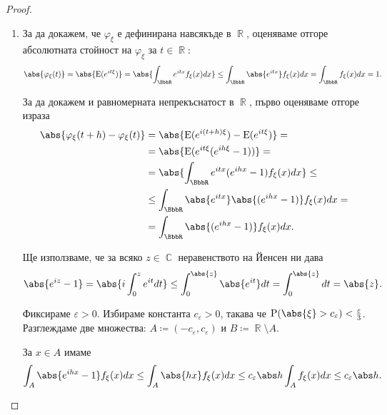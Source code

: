 \documentclass{../../common/topic}
\begin{document}
\begin{proof}
  \hfill
  \begin{enumerate}
    \item За да докажем, че \( \varphi_\xi \) е дефинирана навсякъде в \( \BbbR \), оценяваме отгоре абсолютната стойност на \( \varphi_\xi \) за \( t \in \BbbR \):
    \begin{equation*}
      \abs{\varphi_\xi(t)}
      =
      \abs{\Expect(e^{it\xi})}
      =
      \abs{\int_{\BbbR} e^{itx} f_\xi(x) dx}
      \leq
      \int_{\BbbR} \abs{e^{itx}} f_\xi(x) dx
      =
      \int_{\BbbR} f_\xi(x) dx
      =
      1.
    \end{equation*}

    За да докажем и равномерната непрекъснатост в \( \BbbR \), първо оценяваме отгоре израза
    \begin{align*}
      \abs{\varphi_\xi(t + h) - \varphi_\xi(t)}
      &=
      \abs{\Expect(e^{i(t + h)\xi}) - \Expect(e^{it\xi})}
      = \\ &=
      \abs{\Expect(e^{it\xi} (e^{ih\xi} - 1))}
      = \\ &=
      \abs{\int_{\BbbR} e^{itx} (e^{ihx} - 1) f_\xi(x) dx}
      \leq \\ &\leq
      \int_{\BbbR} \abs{e^{itx}} \abs{(e^{ihx} - 1)} f_\xi(x) dx
      = \\ &=
      \int_{\BbbR} \abs{(e^{ihx} - 1)} f_\xi(x) dx.
    \end{align*}

    Ще използваме, че за всяко \( z \in \BbbC \) неравенството на Йенсен ни дава
    \begin{equation*}
      \abs{e^{iz} - 1}
      =
      \abs{i \int_0^z e^{it} dt}
      \leq
      \int_0^{\abs{z}} \abs{e^{it}} dt
      =
      \int_0^{\abs{z}} dt
      =
      \abs{z}.
    \end{equation*}

    Фиксираме \( \varepsilon > 0 \). Избираме константа \( c_\varepsilon > 0 \), такава че \( \Prob(\abs{\xi} > c_\varepsilon) < \frac \varepsilon 3 \).
    Разглеждаме две множества: \( A \coloneqq (-c_\varepsilon, c_\varepsilon) \) и \( B \coloneqq \BbbR \setminus A \).

    За \( x \in A \) имаме
    \begin{equation*}
      \int_A \abs{e^{ihx} - 1} f_\xi(x) dx
      \leq
      \int_A \abs{h x} f_\xi(x) dx
      \leq
      c_\varepsilon \abs h \int_A f_\xi(x) dx
      \leq
      c_\varepsilon \abs h.
    \end{equation*}


\end{enumerate}
\end{proof}
\end{document}
